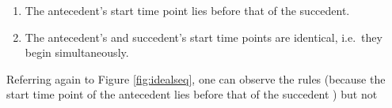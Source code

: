 \begin{enumerate}
	\item The antecedent's start time point lies before that of the succedent.
	\item The antecedent's and succedent's start time points are identical, i.e.~they begin simultaneously.
\end{enumerate}

Referring again to Figure \ref{fig:idealseq}, one can observe the rules  (because the start time point of the antecedent  lies before that of the succedent ) but not 

%
%
